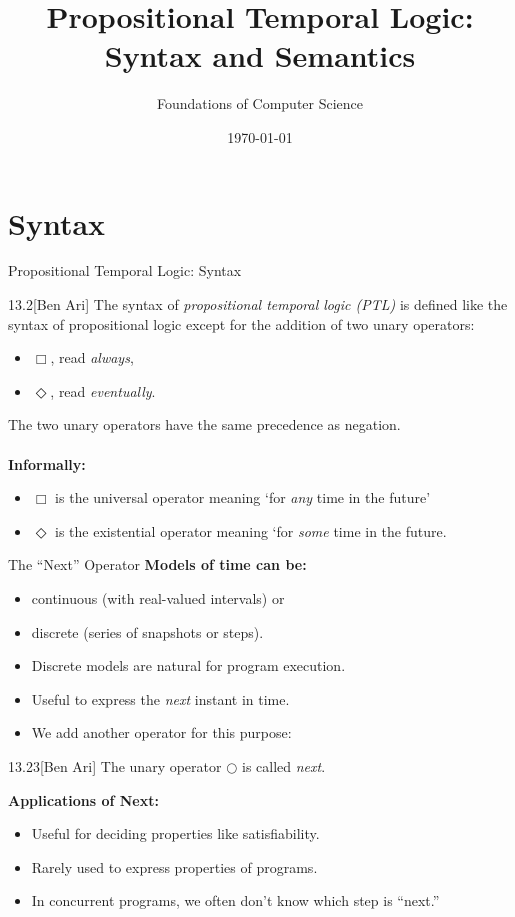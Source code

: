 \documentclass[style=sailor,size=12pt,mode=present]{powerdot}
\title{Propositional Temporal Logic: Syntax and Semantics}
\author{Foundations of Computer Science}
\date{\today}
\begin{document}
\maketitle
\section[slide=false]{Syntax}
\begin{slide}[bm=,toc=]{Propositional Temporal Logic: Syntax}
\begin{defn}{13.2}[Ben Ari]
The syntax of \emph{propositional temporal logic (PTL)} is defined like
the syntax of propositional logic except for the addition of two unary
operators:
\end{defn}
\vspace{-2ex}
\begin{itemize}
\item $\Box$, read \emph{always},
\item $\Diamond$, read \emph{eventually}.
\end{itemize}
The two unary operators have the same precedence as negation.\\~\\
{\bf Informally:}
\begin{itemize}
\item $\Box$ is the universal operator meaning `for \emph{any} time in the
future'
\item $\Diamond$ is the existential operator meaning `for \emph{some} time in
the future.
\end{itemize}
\end{slide}

\begin{wideslide}[bm=,toc=]{The ``Next'' Operator}
{\bf Models of time can be:}
\begin{itemize}
\item continuous (with real-valued intervals) or
\item discrete (series of snapshots or steps).
\item Discrete models are natural for program execution.
\item Useful to express the \emph{next} instant in time.
\item We add another operator for this purpose:
\end{itemize}
\begin{defn}{13.23}[Ben Ari]
The unary operator $\Circle$ is called \emph{next}.
\end{defn}
{\bf Applications of Next:}
\begin{itemize}
\item Useful for deciding properties like satisfiability.
\item Rarely used to express properties of programs.
\item In concurrent programs, we often don't know which step is ``next.''
\end{itemize}
\end{wideslide}
\end{document}
